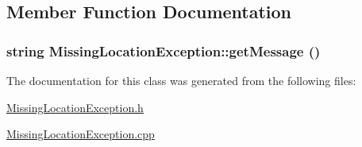 \subsection{Member Function Documentation}
\hypertarget{class_missing_location_exception_d3115ba6a009eec3cfb9fdc7af4c7fdb}{
\subsubsection[getMessage]{\setlength{\rightskip}{0pt plus 5cm}string Missing\-Location\-Exception::get\-Message ()}}
\label{class_missing_location_exception_d3115ba6a009eec3cfb9fdc7af4c7fdb}




The documentation for this class was generated from the following files:\begin{CompactItemize}
\item 
\hyperlink{_missing_location_exception_8h}{Missing\-Location\-Exception.h}\item 
\hyperlink{_missing_location_exception_8cpp}{Missing\-Location\-Exception.cpp}\end{CompactItemize}
